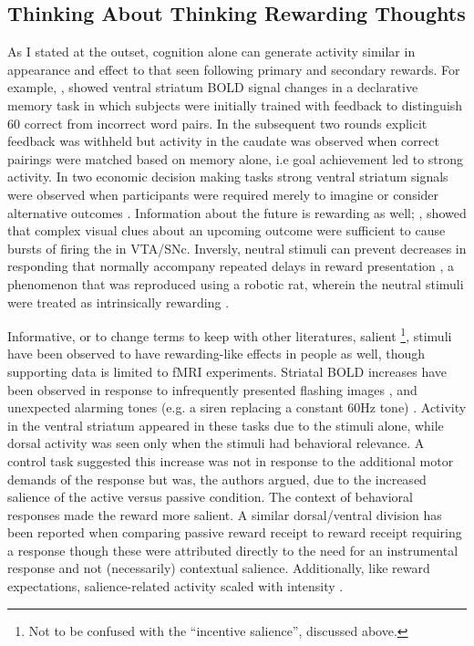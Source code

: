 \documentclass[doc,12pt]{apa}        %
\begin{document}
\subsection{Thinking About Thinking Rewarding Thoughts}
\label{sub:cogrew}
As I stated at the outset, cognition alone can generate activity similar in appearance and effect to that seen following primary and secondary rewards.  For example, , showed ventral striatum BOLD signal changes in a declarative memory task in which subjects were initially trained with feedback to distinguish 60 correct from incorrect word pairs.  In the subsequent two rounds explicit feedback was withheld but activity in the caudate was observed when correct pairings were matched based on memory alone, i.e goal achievement led to strong activity.  In two economic decision making tasks strong ventral striatum signals were observed when participants were required merely to imagine or consider alternative outcomes  \cite{Hayden:2009p6545, Lohrenz:2007p7240}.  Information about the future is rewarding as well; , showed that complex visual clues about an upcoming outcome were sufficient to cause bursts of firing the in VTA/SNc.  Inversly, neutral stimuli can prevent decreases in responding that normally accompany repeated delays in reward presentation \cite{Reed:1992p9094}, a phenomenon that was reproduced using a robotic rat, wherein the neutral stimuli were treated as intrinsically rewarding \cite{Fiore:2008p7249}.

Informative, or to change terms to keep with other literatures, salient
\footnote{
    Not to be confused with the ``incentive salience'', discussed above.
}, stimuli have been observed to have rewarding-like effects in people as well, though supporting data is limited to fMRI experiments.  Striatal BOLD increases have been observed in response to infrequently presented flashing images \cite{Zink:2003p5107}, and unexpected alarming tones (e.g. a siren replacing a constant 60Hz tone) \cite{Zink:2006p7210}.  Activity in the ventral striatum appeared in these tasks due to the stimuli alone, while dorsal activity was seen only when the stimuli had behavioral relevance.  A control task suggested this increase was not in response to the additional motor demands of the response but was, the authors argued, due to the increased salience of the active versus passive condition.  The context of behavioral responses made the reward more salient.  A similar dorsal/ventral division has been reported when comparing passive reward receipt to reward receipt requiring a response \cite{ODoherty:2006p2875} though these were attributed directly to the need for an instrumental response and not (necessarily) contextual salience.  Additionally, like reward expectations, salience-related activity scaled with intensity \cite{Zink:2006p7210}.
\end{document}
